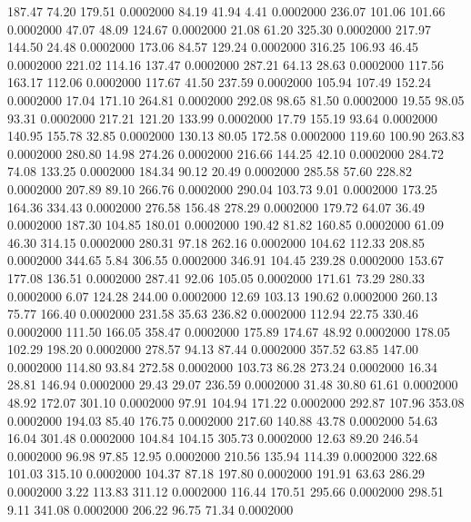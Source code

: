  187.47   74.20  179.51   0.0002000
  84.19   41.94    4.41   0.0002000
 236.07  101.06  101.66   0.0002000
  47.07   48.09  124.67   0.0002000
  21.08   61.20  325.30   0.0002000
 217.97  144.50   24.48   0.0002000
 173.06   84.57  129.24   0.0002000
 316.25  106.93   46.45   0.0002000
 221.02  114.16  137.47   0.0002000
 287.21   64.13   28.63   0.0002000
 117.56  163.17  112.06   0.0002000
 117.67   41.50  237.59   0.0002000
 105.94  107.49  152.24   0.0002000
  17.04  171.10  264.81   0.0002000
 292.08   98.65   81.50   0.0002000
  19.55   98.05   93.31   0.0002000
 217.21  121.20  133.99   0.0002000
  17.79  155.19   93.64   0.0002000
 140.95  155.78   32.85   0.0002000
 130.13   80.05  172.58   0.0002000
 119.60  100.90  263.83   0.0002000
 280.80   14.98  274.26   0.0002000
 216.66  144.25   42.10   0.0002000
 284.72   74.08  133.25   0.0002000
 184.34   90.12   20.49   0.0002000
 285.58   57.60  228.82   0.0002000
 207.89   89.10  266.76   0.0002000
 290.04  103.73    9.01   0.0002000
 173.25  164.36  334.43   0.0002000
 276.58  156.48  278.29   0.0002000
 179.72   64.07   36.49   0.0002000
 187.30  104.85  180.01   0.0002000
 190.42   81.82  160.85   0.0002000
  61.09   46.30  314.15   0.0002000
 280.31   97.18  262.16   0.0002000
 104.62  112.33  208.85   0.0002000
 344.65    5.84  306.55   0.0002000
 346.91  104.45  239.28   0.0002000
 153.67  177.08  136.51   0.0002000
 287.41   92.06  105.05   0.0002000
 171.61   73.29  280.33   0.0002000
   6.07  124.28  244.00   0.0002000
  12.69  103.13  190.62   0.0002000
 260.13   75.77  166.40   0.0002000
 231.58   35.63  236.82   0.0002000
 112.94   22.75  330.46   0.0002000
 111.50  166.05  358.47   0.0002000
 175.89  174.67   48.92   0.0002000
 178.05  102.29  198.20   0.0002000
 278.57   94.13   87.44   0.0002000
 357.52   63.85  147.00   0.0002000
 114.80   93.84  272.58   0.0002000
 103.73   86.28  273.24   0.0002000
  16.34   28.81  146.94   0.0002000
  29.43   29.07  236.59   0.0002000
  31.48   30.80   61.61   0.0002000
  48.92  172.07  301.10   0.0002000
  97.91  104.94  171.22   0.0002000
 292.87  107.96  353.08   0.0002000
 194.03   85.40  176.75   0.0002000
 217.60  140.88   43.78   0.0002000
  54.63   16.04  301.48   0.0002000
 104.84  104.15  305.73   0.0002000
  12.63   89.20  246.54   0.0002000
  96.98   97.85   12.95   0.0002000
 210.56  135.94  114.39   0.0002000
 322.68  101.03  315.10   0.0002000
 104.37   87.18  197.80   0.0002000
 191.91   63.63  286.29   0.0002000
   3.22  113.83  311.12   0.0002000
 116.44  170.51  295.66   0.0002000
 298.51    9.11  341.08   0.0002000
 206.22   96.75   71.34   0.0002000
